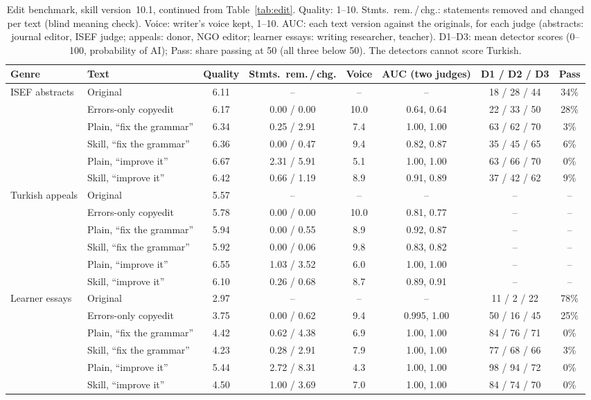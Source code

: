\documentclass[11pt]{article}
\begin{document}
\begin{table}[t]
\centering\small
\setlength{\tabcolsep}{4pt}
\begin{tabular}{llcccccc}
\toprule
Genre & Text & Quality & Stmts.\ rem.\,/\,chg. & Voice & AUC (two judges) & D1 / D2 / D3 & Pass \\
\midrule
ISEF abstracts & Original & 6.11 & -- & -- & -- & 18 / 28 / 44 & 34\% \\
 & Errors-only copyedit & 6.17 & 0.00 / 0.00 & 10.0 & 0.64, 0.64 & 22 / 33 / 50 & 28\% \\
 & Plain, ``fix the grammar'' & 6.34 & 0.25 / 2.91 & 7.4 & 1.00, 1.00 & 63 / 62 / 70 & 3\% \\
 & Skill, ``fix the grammar'' & 6.36 & 0.00 / 0.47 & 9.4 & 0.82, 0.87 & 35 / 45 / 65 & 6\% \\
 & Plain, ``improve it'' & 6.67 & 2.31 / 5.91 & 5.1 & 1.00, 1.00 & 63 / 66 / 70 & 0\% \\
 & Skill, ``improve it'' & 6.42 & 0.66 / 1.19 & 8.9 & 0.91, 0.89 & 37 / 42 / 62 & 9\% \\
\midrule
Turkish appeals & Original & 5.57 & -- & -- & -- & -- & -- \\
 & Errors-only copyedit & 5.78 & 0.00 / 0.00 & 10.0 & 0.81, 0.77 & -- & -- \\
 & Plain, ``fix the grammar'' & 5.94 & 0.00 / 0.55 & 8.9 & 0.92, 0.87 & -- & -- \\
 & Skill, ``fix the grammar'' & 5.92 & 0.00 / 0.06 & 9.8 & 0.83, 0.82 & -- & -- \\
 & Plain, ``improve it'' & 6.55 & 1.03 / 3.52 & 6.0 & 1.00, 1.00 & -- & -- \\
 & Skill, ``improve it'' & 6.10 & 0.26 / 0.68 & 8.7 & 0.89, 0.91 & -- & -- \\
\midrule
Learner essays & Original & 2.97 & -- & -- & -- & 11 / 2 / 22 & 78\% \\
 & Errors-only copyedit & 3.75 & 0.00 / 0.62 & 9.4 & 0.995, 1.00 & 50 / 16 / 45 & 25\% \\
 & Plain, ``fix the grammar'' & 4.42 & 0.62 / 4.38 & 6.9 & 1.00, 1.00 & 84 / 76 / 71 & 0\% \\
 & Skill, ``fix the grammar'' & 4.23 & 0.28 / 2.91 & 7.9 & 1.00, 1.00 & 77 / 68 / 66 & 3\% \\
 & Plain, ``improve it'' & 5.44 & 2.72 / 8.31 & 4.3 & 1.00, 1.00 & 98 / 94 / 72 & 0\% \\
 & Skill, ``improve it'' & 4.50 & 1.00 / 3.69 & 7.0 & 1.00, 1.00 & 84 / 74 / 70 & 0\% \\
\bottomrule
\end{tabular}
\caption{Edit benchmark, skill version~10.1, continued from Table~\ref{tab:edit}. Quality: 1--10. Stmts.\ rem.\,/\,chg.: statements removed and changed per text (blind meaning check). Voice: writer's voice kept, 1--10. AUC: each text version against the originals, for each judge (abstracts: journal editor, ISEF judge; appeals: donor, NGO editor; learner essays: writing researcher, teacher). D1--D3: mean detector scores (0--100, probability of AI); Pass: share passing at 50 (all three below 50). The detectors cannot score Turkish.}
\label{tab:edit-full}
\end{table}
\end{document}
